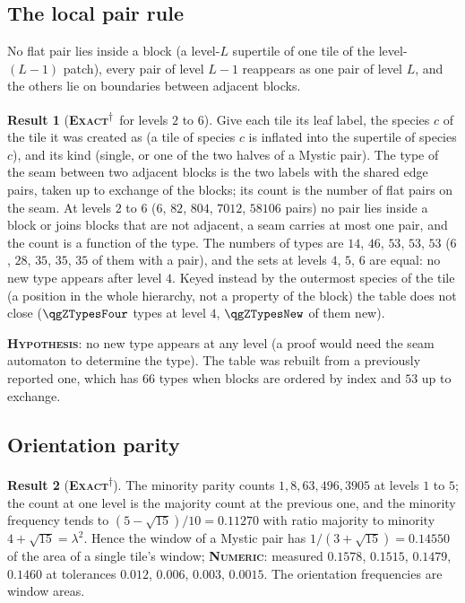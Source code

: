 \documentclass[11pt]{article}
\newcommand{\exact}{\textbf{\textsc{Exact}}}
\newcommand{\numeric}{\textbf{\textsc{Numeric}}}
\newcommand{\hypo}{\textbf{\textsc{Hypothesis}}}
\newcommand{\snap}{\textsuperscript{$\dagger$}}      %
\theoremstyle{definition}
\newtheorem{result}{Result}
\begin{document}
\subsection{The local pair rule}\label{sec:rule}
No flat pair lies inside a block (a level-$L$ supertile of one tile of the level-$(L{-}1)$ patch), every pair of level $L-1$ reappears as one pair of level $L$, and the others lie on boundaries between adjacent blocks.
\begin{result}[\exact\snap\ for levels $2$ to $6$]\label{res:ham-rg-closed}
Give each tile its leaf label, the species $c$ of the tile it was created as (a tile of species $c$ is inflated into the supertile of species $c$), and its kind (single, or one of the two halves of a Mystic pair). The type of the seam between two adjacent blocks is the two labels with the shared edge pairs, taken up to exchange of the blocks; its count is the number of flat pairs on the seam. At levels $2$ to $6$ ($6$, $82$, $804$, $7012$, $58106$ pairs) no pair lies inside a block or joins blocks that are not adjacent, a seam carries at most one pair, and the count is a function of the type. The numbers of types are $14$, $46$, $53$, $53$, $53$ ($6$, $28$, $35$, $35$, $35$ of them with a pair), and the sets at levels $4$, $5$, $6$ are equal: no new type appears after level $4$. Keyed instead by the outermost species of the tile (a position in the whole hierarchy, not a property of the block) the table does not close ($\qgZTypesFour$ types at level $4$, $\qgZTypesNew$ of them new).
\end{result}
\hypo: no new type appears at any level (a proof would need the seam automaton to determine the type). The table was rebuilt from a previously reported one, which has $66$ types when blocks are ordered by index and $53$ up to exchange.

\subsection{Orientation parity}
\begin{result}[\exact\snap]\label{res:flip-parity}
The minority parity counts $1,8,63,496,3905$ at levels $1$ to $5$; the count at one level is the majority count at the previous one, and the minority frequency tends to $(5-\sqrt{15})/10=0.11270$ with ratio majority to minority $4+\sqrt{15}=\lambda^2$. Hence the window of a Mystic pair has $1/(3+\sqrt{15})=0.14550$ of the area of a single tile's window; \numeric: measured $0.1578$, $0.1515$, $0.1479$, $0.1460$ at tolerances $0.012$, $0.006$, $0.003$, $0.0015$. The orientation frequencies are window areas.
\end{result}
\end{document}
